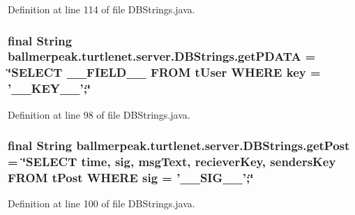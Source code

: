 Definition at line 114 of file D\-B\-Strings.\-java.

\hypertarget{classballmerpeak_1_1turtlenet_1_1server_1_1DBStrings_a93ae46feb4aaeb78cac2ba7b4fce04ec}{
\subsubsection[{get\-P\-D\-A\-T\-A}]{\setlength{\rightskip}{0pt plus 5cm}final String ballmerpeak.\-turtlenet.\-server.\-D\-B\-Strings.\-get\-P\-D\-A\-T\-A = \char`\"{}S\-E\-L\-E\-C\-T \-\_\-\-\_\-\-F\-I\-E\-L\-D\-\_\-\-\_\- F\-R\-O\-M t\-User W\-H\-E\-R\-E key = '\-\_\-\-\_\-\-K\-E\-Y\-\_\-\-\_\-';\char`\"{}\hspace{0.3cm}{\ttfamily [static]}}}\label{classballmerpeak_1_1turtlenet_1_1server_1_1DBStrings_a93ae46feb4aaeb78cac2ba7b4fce04ec}


Definition at line 98 of file D\-B\-Strings.\-java.

\hypertarget{classballmerpeak_1_1turtlenet_1_1server_1_1DBStrings_a80f3d94ed94b75193a7fd3490548739b}{
\subsubsection[{get\-Post}]{\setlength{\rightskip}{0pt plus 5cm}final String ballmerpeak.\-turtlenet.\-server.\-D\-B\-Strings.\-get\-Post = \char`\"{}S\-E\-L\-E\-C\-T time, sig, msg\-Text, reciever\-Key, senders\-Key F\-R\-O\-M t\-Post W\-H\-E\-R\-E sig = '\-\_\-\-\_\-\-S\-I\-G\-\_\-\-\_\-';\char`\"{}\hspace{0.3cm}{\ttfamily [static]}}}\label{classballmerpeak_1_1turtlenet_1_1server_1_1DBStrings_a80f3d94ed94b75193a7fd3490548739b}


Definition at line 100 of file D\-B\-Strings.\-java.


